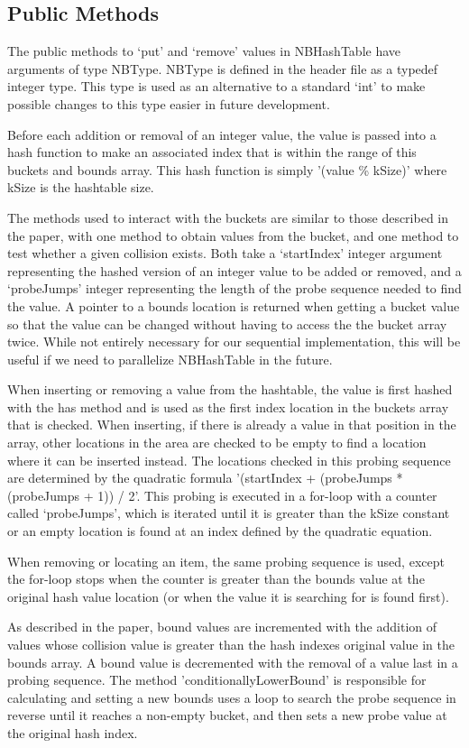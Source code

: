 \documentclass[journal]{IEEEtran}
\begin{document}
\subsection{Public Methods}
The public methods to ‘put’ and ‘remove’ values in NBHashTable have arguments of type NBType. NBType is defined in the header file as a typedef integer type. This type is used as an alternative to a standard ‘int’ to make possible changes to this type easier in future development.

Before each addition or removal of an integer value, the value is passed into a hash function to make an associated index that is within the range of this buckets and bounds array. This hash function is simply '(value \% kSize)' where kSize is the hashtable size.

The methods used to interact with the buckets are similar to those described in the paper, with one method to obtain values from the bucket, and one method to test whether a given collision exists. Both take a ‘startIndex’ integer argument representing the hashed version of an integer value to be added or removed, and a ‘probeJumps’ integer representing the length of the probe sequence needed to find the value. A pointer to a bounds location is returned when getting a bucket value so that the value can be changed without having to access the the bucket array twice. While not entirely necessary for our sequential implementation, this will be useful if we need to parallelize NBHashTable in the future.

When inserting or removing a value from the hashtable, the value is first hashed with the has method and is used as the first index location in the buckets array that is checked. When inserting, if there is already a value in that position in the array, other locations in the area are checked to be empty to find a location where it can be inserted instead. The locations checked in this probing sequence are determined by the quadratic formula '(startIndex + (probeJumps * (probeJumps + 1)) / 2'. This probing is executed in a for-loop with a counter called ‘probeJumps’, which is iterated until it is greater than the kSize constant or an empty location is found at an index defined by the quadratic equation.

When removing or locating an item, the same probing sequence is used, except the for-loop stops when the counter is greater than the bounds value at the original hash value location (or when the value it is searching for is found first).

As described in the paper, bound values are incremented with the addition of values whose collision value is greater than the hash indexes original value in the bounds array. A bound value is decremented with the removal of a value last in a probing sequence. The method ’conditionallyLowerBound’ is responsible for calculating and setting a new bounds uses a loop to search the probe sequence in reverse until it reaches a non-empty bucket, and then sets a new probe value at the original hash index.
\end{document}
